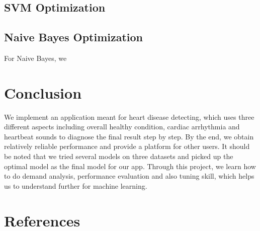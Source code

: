 \documentclass[letterpaper]{article} %
\begin{document}
\subsection{SVM Optimization}


\subsection{Naive Bayes Optimization}

For Naive Bayes, we

\section{Conclusion}

We implement an application meant for heart disease detecting, which uses three different aspects including overall healthy condition, cardiac arrhythmia and heartbeat sounds to diagnose the final result step by step. By the end, we obtain relatively reliable performance and provide a platform for other users. It should be noted that we tried several  models on three datasets and picked up the optimal model as the final model for our app. Through this project, we learn how to do demand analysis, performance evaluation and also tuning skill, which helps us to understand further for machine learning.

\section{References}
\end{document}

